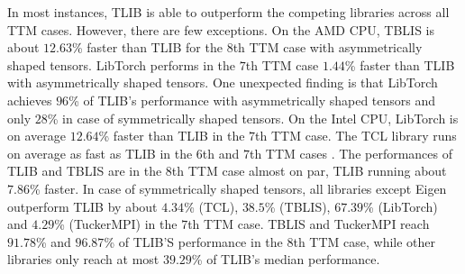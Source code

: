 In most instances, TLIB is able to outperform the competing libraries across all TTM cases.
However, there are few exceptions.
On the AMD CPU, TBLIS is about $12.63$\% faster than TLIB for the $8$th TTM case with asymmetrically shaped tensors.
LibTorch performs in the $7$th TTM case $1.44$\% faster than TLIB with asymmetrically shaped tensors.
One unexpected finding is that LibTorch achieves $96$\% of TLIB's performance with asymmetrically shaped tensors and only $28$\% in case of symmetrically shaped tensors.
On the Intel CPU, LibTorch is on average $12.64$\% faster than TLIB in the $7$th TTM case.
The TCL library runs on average as fast as TLIB in the $6$th and $7$th TTM cases .
The performances of TLIB and TBLIS are in the $8$th TTM case almost on par, TLIB running about $7.86$\% faster.
In case of symmetrically shaped tensors, all libraries except Eigen outperform TLIB by about $4.34$\% (TCL), $38.5$\% (TBLIS), $67.39$\% (LibTorch) and $4.29$\% (TuckerMPI) in the $7$th TTM case.
TBLIS and TuckerMPI reach $91.78$\% and $96.87$\% of TLIB'S performance in the $8$th TTM case, while other libraries only reach at most $39.29$\% of TLIB's median performance.


